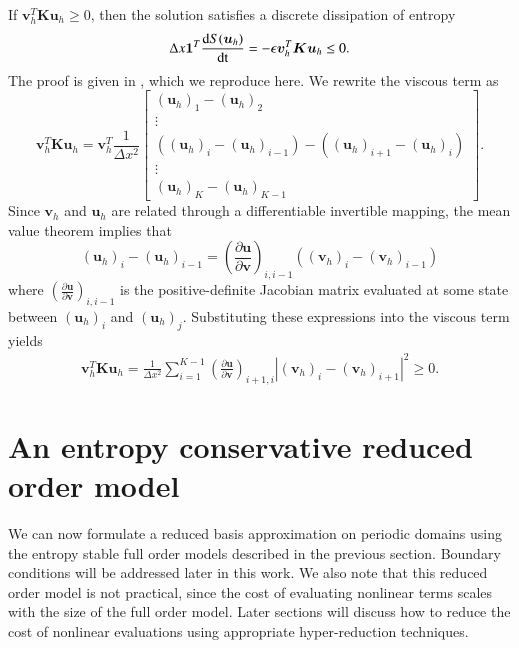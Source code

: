 \documentclass[preprint,10pt]{elsarticle}
\theoremstyle{definition}
\theoremstyle{lemma}
\theoremstyle{theorem}
\theoremstyle{assumption}
\newcommand{\td}[2]{\frac{{\rm d}#1}{{\rm d}{\rm #2}}}
\newcommand{\pd}[2]{\frac{\partial#1}{\partial#2}}
\newcommand{\LRp}[1]{\left( #1 \right)}
\newcommand{\LRb}[1]{\left| #1 \right|}
\begin{document}
If $\bm{v}_h^T\bm{K}\bm{u}_h \geq 0$, then the solution satisfies a discrete dissipation of entropy
\begin{equation}
\Delta x \bm{1}^T\td{S(\bm{u}_h)}{t} = -\epsilon\bm{v}_h^T\bm{K}\bm{u}_h \leq 0.
\label{eq:entropybalancefom}
\end{equation}
The proof is given in \cite{tadmor2006entropy}, which we reproduce here.  We rewrite the viscous term as
\[
\bm{v}_h^T\bm{K}\bm{u}_h = \bm{v}_h^T \frac{1}{\Delta x^2}\begin{bmatrix}
\LRp{\bm{u}_h}_1 - \LRp{\bm{u}_h}_2\\ 
\vdots\\
\LRp{\LRp{\bm{u}_h}_i - \LRp{\bm{u}_h}_{i-1}} - \LRp{\LRp{\bm{u}_h}_{i+1} - \LRp{\bm{u}_h}_{i}}\\
\vdots\\
\LRp{\bm{u}_h}_K- \LRp{\bm{u}_h}_{K-1} 
\end{bmatrix}.
\]
Since $\bm{v}_h$ and $\bm{u}_h$ are related through a differentiable invertible mapping, the mean value theorem implies that
\[
\LRp{\bm{u}_h}_i - \LRp{\bm{u}_h}_{i-1} = \LRp{\pd{\bm{u}}{\bm{v}}}_{i,i-1} \LRp{\LRp{\bm{v}_h}_i - \LRp{\bm{v}_h}_{i-1}}
\]
where $\LRp{\pd{\bm{u}}{\bm{v}}}_{i,i-1}$ is the positive-definite Jacobian matrix evaluated at some state between $(\bm{u}_h)_i$ and $(\bm{u}_h)_j$.  Substituting these expressions into the viscous term yields 
\begin{gather}
\bm{v}_h^T\bm{K}\bm{u}_h = 
 \frac{1}{\Delta x^2}\sum_{i=1}^{K-1} \LRp{\pd{\bm{u}}{\bm{v}}}_{i+1,i} \LRb{\LRp{\bm{v}_h}_{i} - \LRp{\bm{v}_h}_{i+1}}^2 \geq 0.
 \label{eq:entropydissfom}
\end{gather}


\section{An entropy conservative reduced order model}
\label{sec:3}
We can now formulate a reduced basis approximation on periodic domains using the entropy stable full order models described in the previous section.  Boundary conditions will be addressed later in this work.  We also note that this reduced order model is not practical, since the cost of evaluating nonlinear terms scales with the size of the full order model.  Later sections will discuss how to reduce the cost of nonlinear evaluations using appropriate hyper-reduction techniques.
\end{document}
